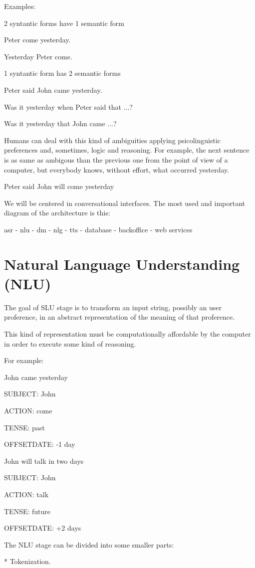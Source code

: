 \documentclass[a4paper,10pt]{article}
\begin{document}
Examples:

2 syntantic forms have 1 semantic form

Peter come yesterday.

Yesterday Peter come.

1 syntantic form has 2 semantic forms

Peter said John came yesterday.

Was it yesterday when Peter said that ...?

Was it yesterday that John came ...?

Humans can deal with this kind of ambiguities applying psicolinguistic preferences and, sometimes, logic and reasoning. For example, the next sentence is as same as ambigous than the previous one from the point of view of a computer, but everybody knows, without effort, what occurred yesterday.

Peter said John will come yesterday

We will be centered in conversational interfaces. The most used and important diagram of the architecture is this:

asr - nlu - dm - nlg - tts - database - backoffice - web services

\section{Natural Language Understanding (NLU)}

The goal of SLU stage is to transform an input string, possibly an user proference, in an abstract representation of the meaning of that proference. 

This kind of representation must be computationally affordable by the computer in order to execute some kind of reasoning.

For example:

John came yesterday 

SUBJECT: John

ACTION: come

TENSE: past

OFFSETDATE: -1 day

John will talk in two days

SUBJECT: John

ACTION: talk

TENSE: future

OFFSETDATE: +2 days

The NLU stage can be divided into some smaller parts:

* Tokenization.
\end{document}
